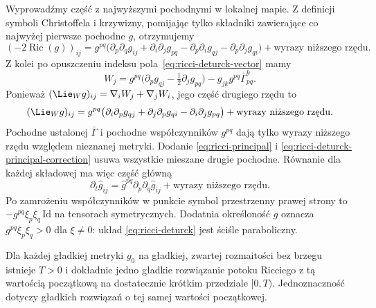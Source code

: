 Wyprowadźmy część z najwyższymi pochodnymi
w lokalnej mapie. Z definicji symboli Christoffela
i krzywizny, pomijając tylko składniki zawierające
co najwyżej pierwsze pochodne $g$, otrzymujemy
\begin{equation}\label{eq:ricci-principal}
 (-2\operatorname{Ric}(g))_{ij}
 =g^{pq}\bigl(
   \partial_p\partial_q g_{ij}
  +\partial_i\partial_j g_{pq}
  -\partial_p\partial_i g_{qj}
  -\partial_p\partial_j g_{qi}\bigr)
  +\text{wyrazy niższego rzędu}.
\end{equation}
Z kolei po opuszczeniu indeksu pola~\eqref{eq:ricci-deturck-vector}
mamy
\[
 W_j=g^{pq}\bigl(\partial_p g_{qj}
                  -\tfrac12\partial_j g_{pq}\bigr)
      -g_{jk}g^{pq}\bar\Gamma^k_{pq}.
\]
Ponieważ $(\Lie_Wg)_{ij}=\nabla_iW_j+\nabla_jW_i$,
jego część drugiego rzędu to
\begin{equation}\label{eq:ricci-deturck-principal-correction}
 (\Lie_Wg)_{ij}
 =g^{pq}\bigl(
   \partial_i\partial_p g_{qj}
  +\partial_j\partial_p g_{qi}
  -\partial_i\partial_j g_{pq}\bigr)
  +\text{wyrazy niższego rzędu}.
\end{equation}
Pochodne ustalonej $\bar\Gamma$ i pochodne współczynników
$g^{pq}$ dają tylko wyrazy niższego rzędu względem
nieznanej metryki. Dodanie
\eqref{eq:ricci-principal} i
\eqref{eq:ricci-deturck-principal-correction} usuwa
wszystkie mieszane drugie pochodne. Równanie dla
każdej składowej ma więc część główną
\begin{equation}\label{eq:ricci-deturck-heat-principal}
 \partial_t\widehat g_{ij}
     =\widehat g^{pq}\partial_p\partial_q
             \widehat g_{ij}
       +\text{wyrazy niższego rzędu}.
\end{equation}
Po zamrożeniu współczynników w punkcie symbol
przestrzenny prawej strony to
$-g^{pq}\xi_p\xi_q\,\mathrm{Id}$ na tensorach
symetrycznych. Dodatnia określoność $g$ oznacza
$g^{pq}\xi_p\xi_q>0$ dla $\xi\ne0$: układ
\eqref{eq:ricci-deturck} jest ściśle paraboliczny.

\begin{twierdzenie}
\label{thm:ricci-short-time}
Dla każdej gładkiej metryki $g_0$ na gładkiej,
zwartej rozmaitości bez brzegu istnieje $T>0$
i dokładnie jedno gładkie rozwiązanie potoku Ricciego
z tą wartością początkową na dostatecznie krótkim
przedziale $[0,T)$. Jednoznaczność dotyczy gładkich
rozwiązań o tej samej wartości początkowej.
\end{twierdzenie}

